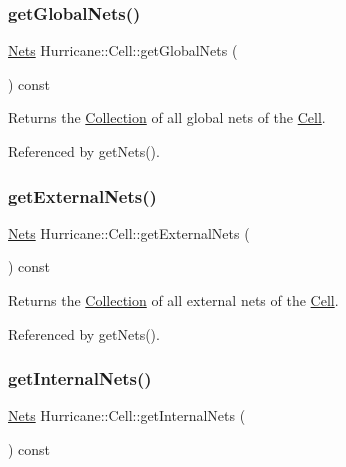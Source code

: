 \subsubsection{\texorpdfstring{get\+Global\+Nets()}{getGlobalNets()}}
{\footnotesize\ttfamily \hyperlink{namespaceHurricane_a3404a8b17130a1824f4a281704b04df7}{Nets} Hurricane\+::\+Cell\+::get\+Global\+Nets (\begin{DoxyParamCaption}{ }\end{DoxyParamCaption}) const}

Returns the \hyperlink{classHurricane_1_1Collection}{Collection} of all global nets of the \hyperlink{classHurricane_1_1Cell}{Cell}. 

Referenced by get\+Nets().

\mbox{\label{classHurricane_1_1Cell_aa80f3345db8c1395fa04a50737208793}} 
\subsubsection{\texorpdfstring{get\+External\+Nets()}{getExternalNets()}}
{\footnotesize\ttfamily \hyperlink{namespaceHurricane_a3404a8b17130a1824f4a281704b04df7}{Nets} Hurricane\+::\+Cell\+::get\+External\+Nets (\begin{DoxyParamCaption}{ }\end{DoxyParamCaption}) const}

Returns the \hyperlink{classHurricane_1_1Collection}{Collection} of all external nets of the \hyperlink{classHurricane_1_1Cell}{Cell}. 

Referenced by get\+Nets().

\mbox{\label{classHurricane_1_1Cell_a0da980d28ad60334da94a3966338f873}} 
\subsubsection{\texorpdfstring{get\+Internal\+Nets()}{getInternalNets()}}
{\footnotesize\ttfamily \hyperlink{namespaceHurricane_a3404a8b17130a1824f4a281704b04df7}{Nets} Hurricane\+::\+Cell\+::get\+Internal\+Nets (\begin{DoxyParamCaption}{ }\end{DoxyParamCaption}) const}

